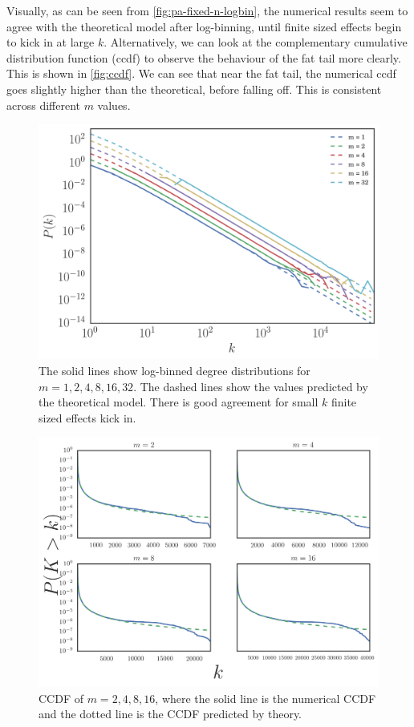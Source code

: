 Visually, as can be seen from \autoref{fig:pa-fixed-n-logbin}, the numerical results seem to agree with the theoretical model after log-binning, until finite sized effects begin to kick in at large $k$. Alternatively, we can look at the complementary cumulative distribution function (ccdf) to observe the behaviour of the fat tail more clearly. This is shown in \autoref{fig:ccdf}. We can see that near the fat tail, the numerical ccdf goes slightly higher than the theoretical, before falling off. This is consistent across different $m$ values.

\begin{figure}
    \centering
    \includegraphics[height=0.5\linewidth]{img/pa-fixed-n-logbin}
    \caption{The solid lines show log-binned degree distributions for $m = 1, 2, 4, 8, 16, 32$. The dashed lines show the values predicted by the theoretical model. There is good agreement for small $k$ finite sized effects kick in. }
    \label{fig:pa-fixed-n-logbin}
\end{figure}

\begin{figure}
    \centering
    \includegraphics[height=0.7\linewidth]{img/ccdf}
    \caption{CCDF of $m=2, 4, 8, 16$, where the solid line is the numerical CCDF and the dotted line is the CCDF predicted by theory.}
    \label{fig:ccdf}
\end{figure}

